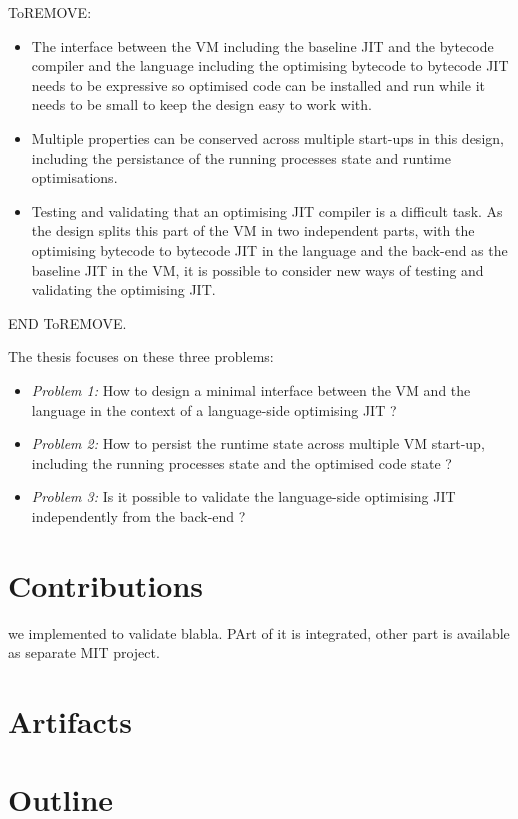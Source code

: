 \documentclass[a4paper,12pt,twoside]{../includes/ThesisStyle}
\begin{document}
ToREMOVE:
\begin{itemize} 
	\item The interface between the VM including the baseline JIT and the bytecode compiler and the language including the optimising bytecode to bytecode JIT needs to be expressive so optimised code can be installed and run while it needs to be small to keep the design easy to work with. 
	\item Multiple properties can be conserved across multiple start-ups in this design, including the persistance of the running processes state and runtime optimisations.
	\item Testing and validating that an optimising JIT compiler is a difficult task. As the design splits this part of the VM in two independent parts, with the optimising bytecode to bytecode JIT in the language and the back-end as the baseline JIT in the VM, it is possible to consider new ways of testing and validating the optimising JIT.
\end{itemize}

END ToREMOVE.

The thesis focuses on these three problems:

\begin{itemize}
	\item \emph{Problem 1:} How to design a minimal interface between the VM and the language in the context of a language-side optimising JIT ?
	\item \emph{Problem 2:} How to persist the runtime state across multiple VM start-up, including the running processes state and the optimised code state ?
	\item \emph{Problem 3:} Is it possible to validate the language-side optimising JIT independently from the back-end ?
\end{itemize}

\section{Contributions}

we implemented to validate blabla. PArt of it is integrated, other part is available as separate MIT project.

\section{Artifacts}

\section{Outline}

\ifx\wholebook\relax\else
    
\end{document}
